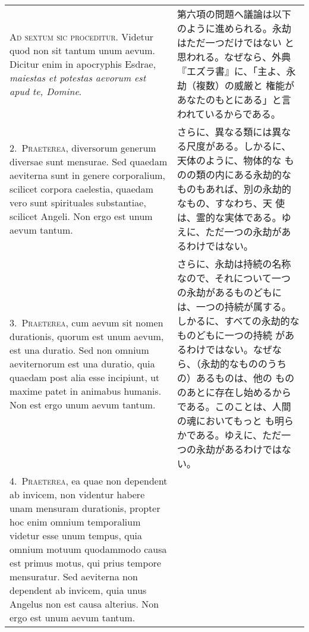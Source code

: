 \documentclass[10pt]{jsarticle} %
\begin{document}
\begin{longtable}{p{21em}p{21em}}

{\huge A}{\scshape d sextum sic proceditur}. Videtur quod non sit tantum unum
aevum. Dicitur enim in apocryphis Esdrae, {\itshape maiestas et potestas aevorum
est apud te, Domine}.

&

第六項の問題へ議論は以下のように進められる。永劫はただ一つだけではない
と思われる。なぜなら、外典『エズラ書』に、「主よ、永劫（複数）の威厳と
権能があなたのもとにある」と言われているからである。

\\


2.~{\scshape Praeterea}, diversorum generum diversae sunt mensurae. Sed quaedam
aeviterna sunt in genere corporalium, scilicet corpora caelestia,
quaedam vero sunt spirituales substantiae, scilicet Angeli. Non ergo est
unum aevum tantum.

&

さらに、異なる類には異なる尺度がある。しかるに、天体のように、物体的な
ものの類の内にある永劫的なものもあれば、別の永劫的なもの、すなわち、天
使は、霊的な実体である。ゆえに、ただ一つの永劫があるわけではない。



\\

3.~{\scshape Praeterea}, cum aevum sit nomen durationis, quorum est unum aevum, est
una duratio. Sed non omnium aeviternorum est una duratio, quia quaedam
post alia esse incipiunt, ut maxime patet in animabus humanis. Non est
ergo unum aevum tantum.

&

さらに、永劫は持続の名称なので、それについて一つの永劫があるものどもに
は、一つの持続が属する。しかるに、すべての永劫的なものどもに一つの持続
があるわけではない。なぜなら、（永劫的なもののうちの）あるものは、他の
もののあとに存在し始めるからである。このことは、人間の魂においてもっと
も明らかである。ゆえに、ただ一つの永劫があるわけではない。



\\


4.~{\scshape Praeterea}, ea quae non dependent ab invicem, non videntur habere unam
mensuram durationis, propter hoc enim omnium temporalium videtur esse
unum tempus, quia omnium motuum quodammodo causa est primus motus, qui
prius tempore mensuratur. Sed aeviterna non dependent ab invicem, quia
unus Angelus non est causa alterius. Non ergo est unum aevum tantum.


\end{longtable}
\end{document}
